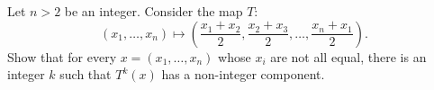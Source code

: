 Let $n > 2$ be an integer. Consider the map $T$:
\[
(x_1, \ldots, x_n) \mapsto \left(\frac{x_1 + x_2}{2}, \frac{x_2 + x_3}{2}, \ldots, \frac{x_n + x_1}{2}\right).
\]
Show that for every $x = (x_1, \ldots, x_n)$ whose $x_i$ are not all equal, there is an integer $k$ such that $T^k(x)$ has a non-integer component.
